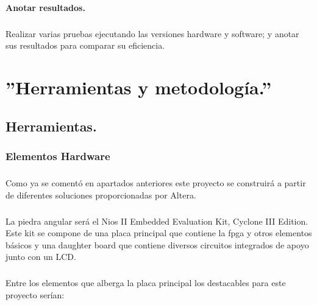 \documentclass[a4paper,12pt,titlepage,final]{book}
\begin{document}
\subsubsection{Anotar resultados.}
\paragraph{}
Realizar varias pruebas ejecutando las versiones hardware y software; y anotar sus resultados para comparar su eficiencia.


\chapter{''Herramientas y metodología.''}

\section{Herramientas.}
\subsection{Elementos Hardware}
\subsubsection*{}

\paragraph{}
Como ya se comentó en apartados anteriores este proyecto se construirá a partir de diferentes soluciones proporcionadas por Altera.

\paragraph{}
La piedra angular será el Nios II Embedded Evaluation Kit, Cyclone III Edition.
Este kit se compone de una placa principal que contiene la fpga y otros
elementos básicos y una daughter board que contiene diversos circuitos integrados
de apoyo junto con un LCD.

\paragraph{}
Entre los elementos que alberga la placa principal los destacables para este
proyecto serían:
\end{document}

